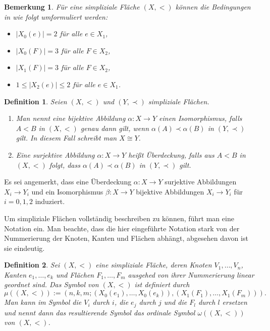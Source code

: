 \documentclass[12pt,titlepage]{article}
\newtheorem{definition}{Definition}[section]
\newtheorem{bemerkung}{Bemerkung}[section]
\begin{document}
\newpage
\begin{bemerkung}
Für eine simpliziale Fläche $(X,<)$ können die Bedingungen in  wie folgt umformuliert werden:
\begin{itemize}
\item $\vert X_{0}(e)\vert=2$ für alle $e \in X_{1}$,
\item $\vert X_{0}(F)\vert=3$ für alle $F \in X_{2}$,
\item $\vert X_{1}(F)\vert=3$ für alle $F \in X_{2}$,
\item $1\leq  \vert X_{2}(e)\vert \leq 2$ für alle $e \in X_{1}$.

\end{itemize}
\end{bemerkung}

\begin{definition} Seien $(X,<)$ und $(Y,\prec)$ simpliziale Flächen.
\begin{enumerate}
 \item Man nennt eine bijektive Abbildung $\alpha: X \to Y$ einen Isomorphismus, falls $A<B$ in $(X,<)$ genau dann gilt, wenn $\alpha(A) \prec \alpha(B)$ in $(Y,\prec)$ gilt. In diesem Fall schreibt man $X \cong Y$.
\item Eine surjektive Abbildung $\alpha: X \to Y$ heißt Überdeckung, falls aus $A<B$ in $(X,<)$ folgt, dass $\alpha(A) \prec \alpha(B)$ in $(Y,\prec)$ gilt. 
\end{enumerate}
\end{definition}
Es sei angemerkt, dass eine Überdeckung $\alpha:X\to Y$ surjektive Abbildungen $X_{i} \to Y_{i}$ und ein Isomorphismus $\beta:X \to Y$ bijektive Abbildungen $X_{i} \to Y_{i}$ für $i=0,1,2$ induziert.

Um simpliziale Flächen vollständig beschreiben zu können, führt man eine Notation ein. Man beachte, dass die hier eingeführte Notation stark von der Nummerierung der Knoten, Kanten und Flächen abhängt, abgesehen davon ist sie eindeutig.
\begin{definition}
 Sei $(X,<)$ eine simpliziale Fläche, deren Knoten $V_{1},\ldots,V_{n}$, Kanten $e_{1},\ldots,e_{k}$ und Flächen $F_{1},\ldots,F_{m}$ ausgehed von ihrer Nummerierung linear geordnet sind. Das \emph{Symbol} von $(X,<)$ ist definiert durch 
\[
\mu((X,<)):=(n,k,m;(X_{0}(e_{1}),\ldots,X_{0}(e_{k})),(X_{1}(F_{1}),\ldots,X_{1}(F_{m}))).
\]
Man kann im Symbol die $V_{i}$ durch $i$, die $e_{j}$ durch $j$ und die $F_{l}$ durch $l$ ersetzen und nennt dann das resultierende Symbol das \emph{ordinale Symbol} $\omega((X,<))$ von $(X,<)$.
\end{definition}
\end{document}
